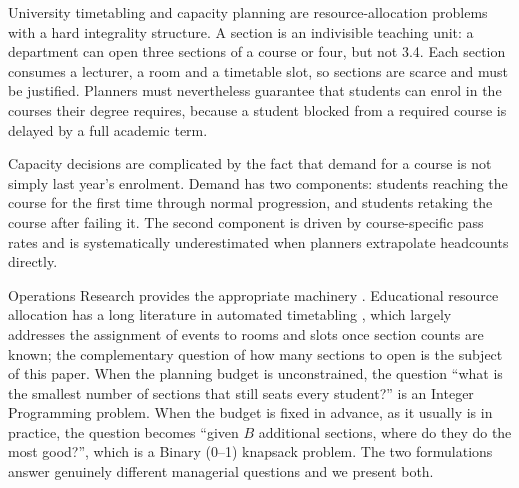 \documentclass[conference]{IEEEtran}
\begin{document}
University timetabling and capacity planning are resource-allocation problems with a
hard integrality structure. A section is an indivisible teaching unit: a department can
open three sections of a course or four, but not 3.4. Each section consumes a lecturer,
a room and a timetable slot, so sections are scarce and must be justified. Planners must
nevertheless guarantee that students can enrol in the courses their degree requires,
because a student blocked from a required course is delayed by a full academic term.

Capacity decisions are complicated by the fact that demand for a course is not simply
last year's enrolment. Demand has two components: students reaching the course for the
first time through normal progression, and students retaking the course after failing
it. The second component is driven by course-specific pass rates and is systematically
underestimated when planners extrapolate headcounts directly.

Operations Research provides the appropriate machinery \cite{hillier}. Educational resource allocation has a long literature in automated timetabling \cite{burke}, which largely addresses the assignment of events to rooms and slots once section counts are known; the complementary question of how many sections to open is the subject of this paper. When the planning budget is
unconstrained, the question ``what is the smallest number of sections that still seats
every student?'' is an Integer Programming problem. When the budget is fixed in advance,
as it usually is in practice, the question becomes ``given $B$ additional sections,
where do they do the most good?'', which is a Binary (0--1) knapsack problem. The two
formulations answer genuinely different managerial questions and we present both.
\end{document}
